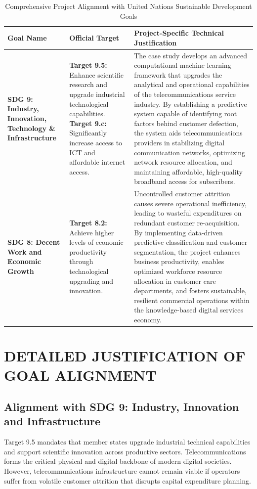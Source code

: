 \begin{table}[H]
\centering
\small
\begin{tabular}{|p{3.2cm}|p{2.4cm}|p{8.5cm}|}
\hline
\textbf{Goal Name} & \textbf{Official Target} & \textbf{Project-Specific Technical Justification} \\
\hline
\textbf{SDG 9: Industry, Innovation, Technology \& Infrastructure} & 
\textbf{Target 9.5:} Enhance scientific research and upgrade industrial technological capabilities. \newline \newline
\textbf{Target 9.c:} Significantly increase access to ICT and affordable internet access. & 
The case study develops an advanced computational machine learning framework that upgrades the analytical and operational capabilities of the telecommunications service industry. By establishing a predictive system capable of identifying root factors behind customer defection, the system aids telecommunications providers in stabilizing digital communication networks, optimizing network resource allocation, and maintaining affordable, high-quality broadband access for subscribers. \\
\hline
\textbf{SDG 8: Decent Work and Economic Growth} & 
\textbf{Target 8.2:} Achieve higher levels of economic productivity through technological upgrading and innovation. & 
Uncontrolled customer attrition causes severe operational inefficiency, leading to wasteful expenditures on redundant customer re-acquisition. By implementing data-driven predictive classification and customer segmentation, the project enhances business productivity, enables optimized workforce resource allocation in customer care departments, and fosters sustainable, resilient commercial operations within the knowledge-based digital services economy. \\
\hline
\end{tabular}
\caption{Comprehensive Project Alignment with United Nations Sustainable Development Goals}
\label{tab:sdg_mapping_full}
\end{table}

\section{DETAILED JUSTIFICATION OF GOAL ALIGNMENT}

\subsection{Alignment with SDG 9: Industry, Innovation and Infrastructure}
Target 9.5 mandates that member states upgrade industrial technical capabilities and support scientific innovation across productive sectors. Telecommunications forms the critical physical and digital backbone of modern digital societies. However, telecommunications infrastructure cannot remain viable if operators suffer from volatile customer attrition that disrupts capital expenditure planning.

